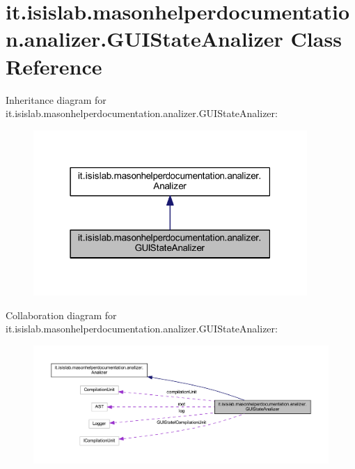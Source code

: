 \hypertarget{classit_1_1isislab_1_1masonhelperdocumentation_1_1analizer_1_1_g_u_i_state_analizer}{\section{it.\-isislab.\-masonhelperdocumentation.\-analizer.\-G\-U\-I\-State\-Analizer Class Reference}
\label{classit_1_1isislab_1_1masonhelperdocumentation_1_1analizer_1_1_g_u_i_state_analizer}
}


Inheritance diagram for it.\-isislab.\-masonhelperdocumentation.\-analizer.\-G\-U\-I\-State\-Analizer\-:
\nopagebreak
\begin{figure}[H]
\begin{center}
\leavevmode
\includegraphics[width=295pt]{classit_1_1isislab_1_1masonhelperdocumentation_1_1analizer_1_1_g_u_i_state_analizer__inherit__graph}
\end{center}
\end{figure}


Collaboration diagram for it.\-isislab.\-masonhelperdocumentation.\-analizer.\-G\-U\-I\-State\-Analizer\-:
\nopagebreak
\begin{figure}[H]
\begin{center}
\leavevmode
\includegraphics[width=350pt]{classit_1_1isislab_1_1masonhelperdocumentation_1_1analizer_1_1_g_u_i_state_analizer__coll__graph}
\end{center}
\end{figure}
